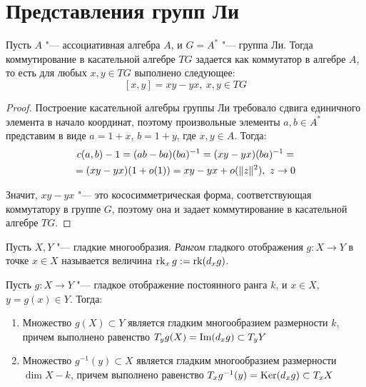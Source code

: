 \section{Представления групп Ли}

\begin{theorem}
	Пусть $A$ "--- ассоциативная алгебра $A$, и $G = A^*$ "--- группа Ли. Тогда коммутирование в касательной алгебре $TG$ задается как коммутатор в алгебре $A$, то есть для любых $x, y \in TG$ выполнено следующее:
	\[[x, y] = xy - yx,~x, y \in TG\]
\end{theorem}

\begin{proof}
	Построение касательной алгебры группы Ли требовало сдвига единичного элемента в начало координат, поэтому произвольные элементы $a, b \in A^*$ представим в виде $a = 1 + x$, $b = 1+y$, где $x, y \in A$. Тогда:
	\begin{multline*}
		c(a, b) - 1 = (ab - ba)(ba)^{-1} = (xy - yx)(ba)^{-1} =
		\\
		= (xy - yx)(1 + o(1)) = xy - yx + o(\|z\|^2),~z \to 0
	\end{multline*}
	
	Значит, $xy - yx$ "--- это кососимметрическая форма, соответствующая коммутатору в группе $G$, поэтому она и задает коммутирование в касательной алгебре $TG$.
\end{proof}

\begin{definition}
	Пусть $X, Y$ "--- гладкие многообразия. \textit{Рангом} гладкого отображения $g : X \to Y$ в точке $x \in X$ называется величина $\operatorname{rk}_xg := \operatorname{rk} (d_xg)$.
\end{definition}

\begin{theorem}
	Пусть $g : X \to Y$ "--- гладкое отображение постоянного ранга $k$, и $x \in X$, $y = g(x) \in Y$. Тогда:
	\begin{enumerate}
		\item Множество $g(X) \subset Y$ является гладким многообразием размерности $k$, причем выполнено равенство $T_{y}g(X) = \operatorname{Im}(d_{x}g) \subset T_{y}Y$
		
		\item Множество $g^{-1}(y) \subset X$ является гладким многообразием размерности $\dim{X} - k$, причем выполнено равенство $T_x g^{-1}(y) = \operatorname{Ker}(d_xg) \subset T_xX$
	\end{enumerate}
\end{theorem}

